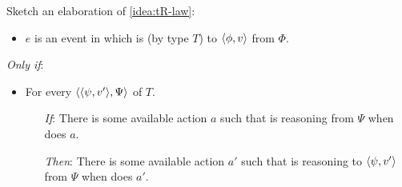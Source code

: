 \begin{note}
  Sketch an elaboration of \autoref{idea:tR-law}:

  \begin{sketch}[\tRN{2}]
    \label{sketch:tR}

    \noindent%

    \begin{itemize}
    \item
      \(e\) is an event in which \vAgent{} is \emph{} (by type \(T\)) to \(\langle \phi, v \rangle\) from \(\Phi\).
    \end{itemize}

    \emph{Only if}:

    \begin{itemize}[noitemsep]
      \item
        For every \tI{} \(\langle \langle \psi, v' \rangle, \Psi \rangle\) of \(T\).
        \begin{itemize}[noitemsep]
        \item[\emph{If}:]
          There is some available action \(a\) such that \vAgent{} is reasoning from \(\Psi\) when \vAgent{} does \(a\).
        \item[\emph{Then}:]
          There is some available action \(a'\) such that \vAgent{} is reasoning to \(\langle \psi, v' \rangle\) from \(\Psi\) when \vAgent{} does \(a'\).
        \end{itemize}
      \end{itemize}
    \vspace{-\baselineskip}
  \end{sketch}


\end{note}
